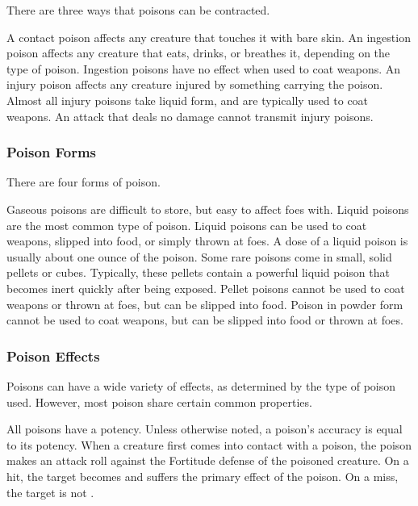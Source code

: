             There are three ways that poisons can be contracted.

             A contact poison affects any creature that touches it with bare skin.
             An ingestion poison affects any creature that eats, drinks, or breathes it, depending on the type of poison.
            Ingestion poisons have no effect when used to coat weapons.
             An injury poison affects any creature injured by something carrying the poison.
            Almost all injury poisons take liquid form, and are typically used to coat weapons.
            An attack that deals no damage cannot transmit injury poisons.

        \subsubsection{Poison Forms}\label{Poison Forms}

            There are four forms of poison.

             Gaseous poisons are difficult to store, but easy to affect foes with.
             Liquid poisons are the most common type of poison.
            Liquid poisons can be used to coat weapons, slipped into food, or simply thrown at foes.
            A dose of a liquid poison is usually about one ounce of the poison.
             Some rare poisons come in small, solid pellets or cubes.
            Typically, these pellets contain a powerful liquid poison that becomes inert quickly after being exposed.
            Pellet poisons cannot be used to coat weapons or thrown at foes, but can be slipped into food.
             Poison in powder form cannot be used to coat weapons, but can be slipped into food or thrown at foes.

        \subsubsection{Poison Effects}\label{Poison Effects}

            Poisons can have a wide variety of effects, as determined by the type of poison used.
            However, most poison share certain common properties.

            All poisons have a potency.
            Unless otherwise noted, a poison's accuracy is equal to its potency.
            When a creature first comes into contact with a poison, the poison makes an attack roll against the Fortitude defense of the poisoned creature.
            On a hit, the target becomes  and suffers the primary effect of the poison. 
            On a miss, the target is not .

